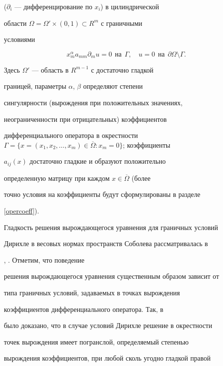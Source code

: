 ($\partial_i$ --- дифференцирование по $x_i$) в цилиндрической


области $\Omega=\Omega'\times (0,1) \subset R^m$ с граничными


условиями


\begin{equation}\label{boundcond}


x_m^\alpha a_{mm}\partial_m u = 0 \ \ \text{на} \ \ \Gamma,


\quad u = 0 \ \ \text{на} \ \ \partial\Omega \setminus \Gamma.


\end{equation}


Здесь $\Omega'$ --- область в $R^{m-1}$ с достаточно гладкой


границей, параметры $\alpha$, $\beta$ определяют степени


сингулярности (вырождения при положительных значениях,


неограниченности при отрицательных) коэффициентов


дифференциального оператора в окрестности $\Gamma=\{x=(x_1,x_2,


\dotsc, x_m) \in \overline{\Omega}: x_m=0\}$; коэффициенты


$a_{ij}(x)$ достаточно гладкие и образуют положительно


определенную матрицу при каждом $x \in \overline\Omega$ (более


точно условия на коэффициенты будут сформулированы в разделе


\ref{opercoeff}).





Гладкость решения вырождающегося уравнения для граничных условий


Дирихле в весовых нормах пространств Соболева рассматривалась в


\cite{LizNik-Diff}, \cite{Kidiraliev}. Отметим, что поведение


решения вырождающегося уравнения существенным образом зависит от


типа граничных условий, задаваемых в точках вырождения


коэффициентов дифференциального оператора. Так, в \cite{IzVuz03-1}


было доказано, что в случае условий Дирихле решение в окрестности


точек вырождения имеет погранслой, определяемый степенью


вырождения коэффициентов, при любой сколь угодно гладкой правой


